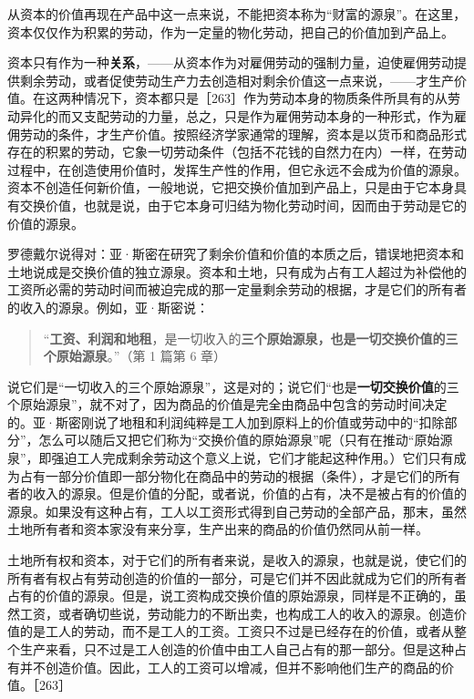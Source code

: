 从资本的价值再现在产品中这一点来说，不能把资本称为“财富的源泉”。在这里，资本仅仅作为积累的劳动，作为一定量的物化劳动，把自己的价值加到产品上。

资本只有作为一种\textbf{关系}，——从资本作为对雇佣劳动的强制力量，迫使雇佣劳动提供剩余劳动，或者促使劳动生产力去创造相对剩余价值这一点来说，——才生产价值。在这两种情况下，资本都只是［263］作为劳动本身的物质条件所具有的从劳动异化的而又支配劳动的力量，总之，只是作为雇佣劳动本身的一种形式，作为雇佣劳动的条件，才生产价值。按照经济学家通常的理解，资本是以货币和商品形式存在的积累的劳动，它象一切劳动条件（包括不花钱的自然力在内）一样，在劳动过程中，在创造使用价值时，发挥生产性的作用，但它永远不会成为价值的源泉。资本不创造任何新价值，一般地说，它把交换价值加到产品上，只是由于它本身具有交换价值，也就是说，由于它本身可归结为物化劳动时间，因而由于劳动是它的价值的源泉。

罗德戴尔说得对：亚·斯密在研究了剩余价值和价值的本质之后，错误地把资本和土地说成是交换价值的独立源泉。资本和土地，只有成为占有工人超过为补偿他的工资所必需的劳动时间而被迫完成的那一定量剩余劳动的根据，才是它们的所有者的收入的源泉。例如，亚·斯密说：

\begin{quote}“\textbf{工资、利润和地租}，是一切收入的\textbf{三个原始源泉，也是一切交换价值的三个原始源泉}。”（第 1 篇第 6 章）\end{quote}

说它们是“一切收入的三个原始源泉”，这是对的；说它们“也是\textbf{一切交换价值}的三个原始源泉”，就不对了，因为商品的价值是完全由商品中包含的劳动时间决定的。亚·斯密刚说了地租和利润纯粹是工人加到原料上的价值或劳动中的“扣除部分”，怎么可以随后又把它们称为“交换价值的原始源泉”呢（只有在推动“原始源泉”，即强迫工人完成剩余劳动这个意义上说，它们才能起这种作用。）它们只有成为占有一部分价值即一部分物化在商品中的劳动的根据（条件），才是它们的所有者的收入的源泉。但是价值的分配，或者说，价值的占有，决不是被占有的价值的源泉。如果没有这种占有，工人以工资形式得到自己劳动的全部产品，那末，虽然土地所有者和资本家没有来分享，生产出来的商品的价值仍然同从前一样。

土地所有权和资本，对于它们的所有者来说，是收入的源泉，也就是说，使它们的所有者有权占有劳动创造的价值的一部分，可是它们并不因此就成为它们的所有者占有的价值的源泉。但是，说工资构成交换价值的原始源泉，同样是不正确的，虽然工资，或者确切些说，劳动能力的不断出卖，也构成工人的收入的源泉。创造价值的是工人的劳动，而不是工人的工资。工资只不过是已经存在的价值，或者从整个生产来看，只不过是工人创造的价值中由工人自己占有的那一部分。但是这种占有并不创造价值。因此，工人的工资可以增减，但并不影响他们生产的商品的价值。［263］

